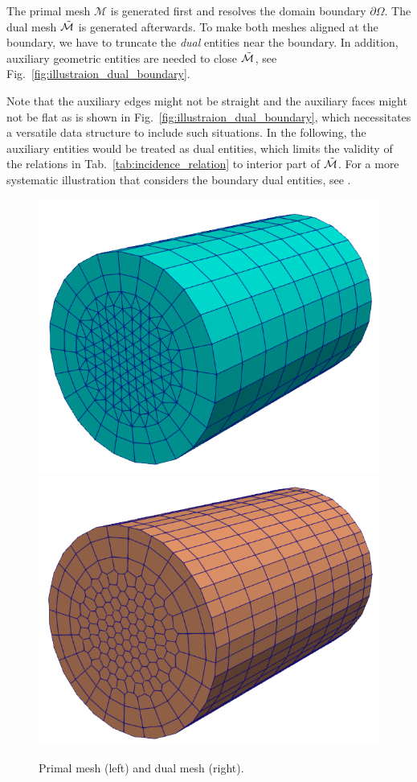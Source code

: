 \documentclass{article}
\begin{document}
The primal mesh $\mathcal{M}$ is generated first and resolves the domain boundary
$\partial\Omega$. The dual mesh $\Tilde{\mathcal{M}}$ is generated afterwards. To make
both meshes aligned at the boundary, we have to truncate the \emph{dual} entities near the
boundary. In addition, auxiliary geometric entities are needed to close
$\Tilde{\mathcal{M}}$, see Fig.~\ref{fig:illustraion_dual_boundary}.

Note that the auxiliary edges might not be straight and the auxiliary faces might not be
flat as is shown in Fig.~\ref{fig:illustraion_dual_boundary}, which necessitates a
versatile data structure to include such situations. In the following, the auxiliary
entities would be treated as dual entities, which limits the validity of the relations in
Tab.~\ref{tab:incidence_relation} to interior part of $\Tilde{\mathcal{M}}$. For a more
systematic illustration that considers the boundary dual entities, see
\cite[][Sec. 5]{hip_1999}.

\begin{figure}
    \centering
    \includegraphics[scale=0.3]{primal_mesh.png}
    \hspace{1cm}
    \includegraphics[scale=0.3]{dual_mesh.png}
    \caption{Primal mesh (left) and dual mesh (right).}
    \label{fig:primal_dual_meshes}
\end{figure}
\end{document}
